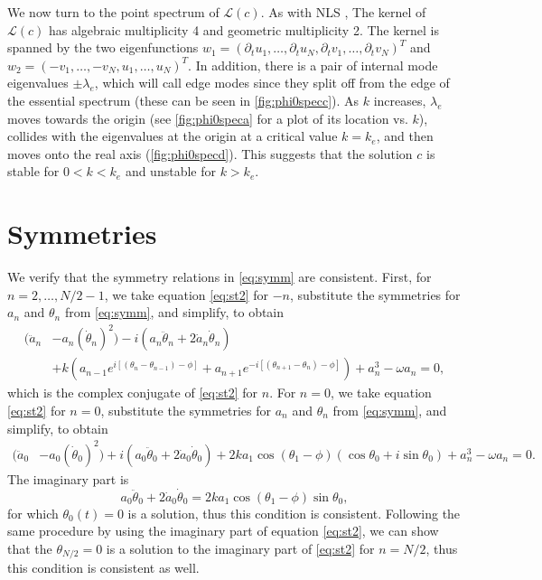 \documentclass[11pt,reqno]{amsart}
\def\calL{{\mathcal L}}
\begin{document}
We now turn to the point spectrum of $\calL(c)$. As with NLS \cite[Chapter 2.1.1.1]{Kevrekidis2009},
The kernel of $\calL(c)$ has algebraic multiplicity 4 and geometric multiplicity 2. The kernel is spanned by the two eigenfunctions 
$w_1 = (\partial_t u_1, \dots, \partial_t u_N, \partial_t v_1, \dots, \partial_t v_N )^T$ and 
$w_2 = (-v_1, \dots, -v_N, u_1, \dots, u_N )^T$. In addition, there is a pair of internal mode eigenvalues $\pm \lambda_e$, which will call edge modes since they split off from the edge of the essential spectrum (these can be seen in \cref{fig:phi0specc}). As $k$ increases, $\lambda_e$ moves towards the origin (see \cref{fig:phi0speca} for a plot of its location vs. $k$), collides with the eigenvalues at the origin at a critical value $k = k_e$, and then moves onto the real axis (\cref{fig:phi0specd}). This suggests that the solution $c$ is stable for $0 < k < k_e$ and unstable for $k > k_e$.

\appendix

\section{Symmetries}\label{app:symm}

We verify that the symmetry relations in \cref{eq:symm} are consistent. First, for $n = 2, \dots, N/2-1$, we take equation \cref{eq:st2} for $-n$, substitute the symmetries for $a_n$ and $\theta_n$ from \cref{eq:symm}, and simplify, to obtain 
\begin{equation*}
\begin{aligned}
(\ddot a_n &- a_n (\dot \theta_n)^2) 
- i ( a_n \ddot\theta_n + 2 \dot a_n \dot \theta_n )\\
&+ k\left(a_{n-1}e^{i[(\theta_n - \theta_{n-1}) - \phi]} + a_{n+1}e^{-i[(\theta_{n+1} - \theta_{n}) - \phi]} \right)+a_n^3 - \omega a_n = 0,
\end{aligned}
\end{equation*}	
which is the complex conjugate of \cref{eq:st2} for $n$. For $n = 0$, we take equation \cref{eq:st2} for $n=0$, substitute the symmetries for $a_n$ and $\theta_n$ from \cref{eq:symm}, and simplify, to obtain 
\begin{equation*}
\begin{aligned}
(\ddot a_0 &- a_0 (\dot \theta_0)^2) 
+ i ( a_0 \ddot\theta_0 + 2 \dot a_0 \dot \theta_0 )
+ 2 k a_1 \cos(\theta_1 - \phi)(\cos \theta_0 + i \sin \theta_0) + a_n^3 - \omega a_n = 0.
\end{aligned}
\end{equation*}
The imaginary part is
\begin{equation}\label{eq:n0imagpart}
a_0 \ddot\theta_0 + 2 \dot a_0 \dot \theta_0 = 2 k a_1 \cos(\theta_1 - \phi) \sin \theta_0,
\end{equation}
for which $\theta_0(t) = 0$ is a solution, thus this condition is consistent. Following the same procedure by using the imaginary part of equation \cref{eq:st2}, we can show that the $\theta_{N/2} = 0$ is a solution to the imaginary part of \cref{eq:st2} for $n=N/2$, thus this condition is consistent as well.
\end{document}
